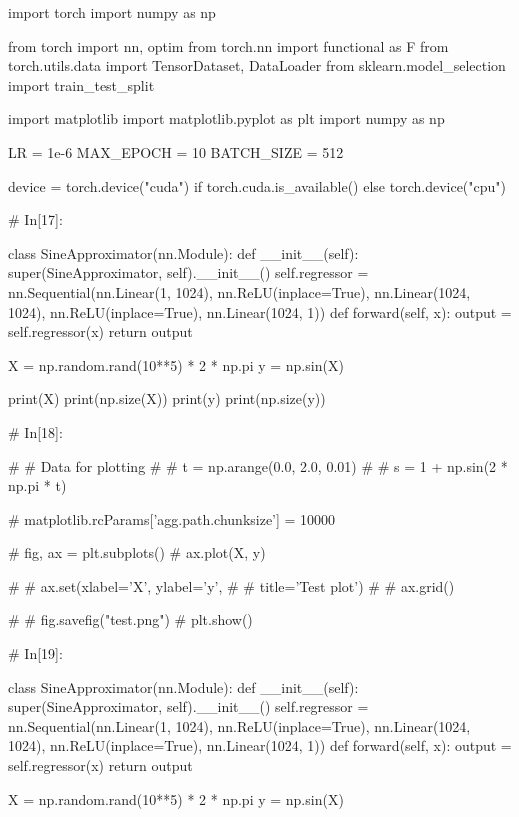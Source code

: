 
import torch
import numpy as np

from torch import nn, optim
from torch.nn import functional as F
from torch.utils.data import TensorDataset, DataLoader
from sklearn.model_selection import train_test_split

import matplotlib
import matplotlib.pyplot as plt
import numpy as np


LR = 1e-6
MAX_EPOCH = 10
BATCH_SIZE = 512

device = torch.device("cuda") if torch.cuda.is_available() else torch.device("cpu")


# In[17]:


class SineApproximator(nn.Module):
    def __init__(self):
        super(SineApproximator, self).__init__()
        self.regressor = nn.Sequential(nn.Linear(1, 1024),
                                       nn.ReLU(inplace=True),
                                       nn.Linear(1024, 1024),
                                       nn.ReLU(inplace=True),
                                       nn.Linear(1024, 1))
    def forward(self, x):
        output = self.regressor(x)
        return output

X = np.random.rand(10**5) * 2 * np.pi
y = np.sin(X)

print(X)
print(np.size(X))
print(y)
print(np.size(y))


# In[18]:



# # Data for plotting
# # t = np.arange(0.0, 2.0, 0.01)
# # s = 1 + np.sin(2 * np.pi * t)

# matplotlib.rcParams['agg.path.chunksize'] = 10000

# fig, ax = plt.subplots()
# ax.plot(X, y)

# # ax.set(xlabel='X', ylabel='y',
# #        title='Test plot')
# # ax.grid()

# # fig.savefig("test.png")
# plt.show()


# In[19]:


class SineApproximator(nn.Module):
    def __init__(self):
        super(SineApproximator, self).__init__()
        self.regressor = nn.Sequential(nn.Linear(1, 1024),
                                       nn.ReLU(inplace=True),
                                       nn.Linear(1024, 1024),
                                       nn.ReLU(inplace=True),
                                       nn.Linear(1024, 1))
    def forward(self, x):
        output = self.regressor(x)
        return output

X = np.random.rand(10**5) * 2 * np.pi
y = np.sin(X)

